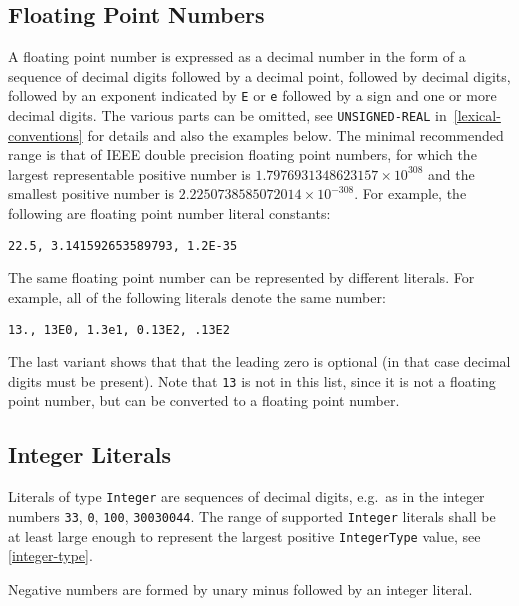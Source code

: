 \subsection{Floating Point Numbers}\label{floating-point-numbers}

A floating point number is expressed as a decimal number in the form of a sequence of decimal digits followed by a decimal point, followed by decimal digits, followed by an exponent indicated by \lstinline!E! or \lstinline!e! followed by a sign and one or more decimal digits.
The various parts can be omitted, see \lstinline[language=grammar]!UNSIGNED-REAL! in~\cref{lexical-conventions} for details and also the examples below.
The minimal recommended range is that of IEEE double precision floating point numbers, for which the largest representable positive number is $1.7976931348623157\times10^{308}$ and the smallest positive number is $2.2250738585072014\times 10^{-308}$.
For example, the following are floating point number literal constants:
\begin{lstlisting}[language=modelica]
22.5, 3.141592653589793, 1.2E-35
\end{lstlisting}

The same floating point number can be represented by different literals.
For example, all of the following literals denote the same number:
\begin{lstlisting}[language=modelica]
13., 13E0, 1.3e1, 0.13E2, .13E2
\end{lstlisting}
The last variant shows that that the leading zero is optional (in that case decimal digits must be present).
Note that \lstinline!13! is not in this list, since it is not a floating point number,
but can be converted to a floating point number.

\subsection{Integer Literals}\label{integer-literals}

Literals of type \lstinline!Integer! are sequences of decimal digits, e.g.\ as in the integer numbers \lstinline!33!, \lstinline!0!, \lstinline!100!, \lstinline!30030044!.
The range of supported \lstinline!Integer! literals shall be at least large enough to represent the largest positive \lstinline!IntegerType! value, see \cref{integer-type}.

\begin{nonnormative}
Negative numbers are formed by unary minus followed by an integer literal.
\end{nonnormative}

